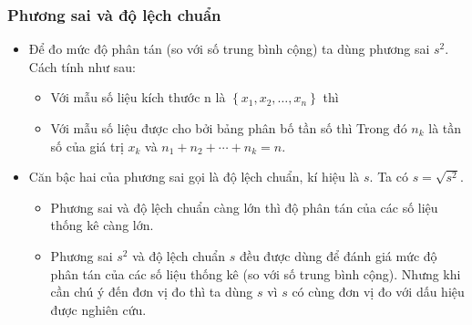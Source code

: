 \subsubsection{Phương sai và độ lệch chuẩn}
\begin{itemize}
	\item [\iconMT]  Để đo mức độ phân tán (so với số trung bình cộng) ta dùng phương sai $s^{2}$. Cách tính như sau:
	\begin{itemize}
		\item
		Với mẫu số liệu kích thước $\mathrm{n}$ là $\left\{x_{1}, x_{2}, \ldots, x_{n}\right\}$ thì
		\item
		Với mẫu số liệu được cho bởi bảng phân bố tần số thì
		Trong đó $n_k$ là tần số của giá trị $x_k$ và $n_1+n_2+ \cdots + n_k=n$.
	\end{itemize}
	\item [\iconMT]  Căn bậc hai của phương sai gọi là độ lệch chuẩn, kí hiệu là $s$. Ta có $s=\sqrt{s^2}$.
	\begin{tcolorbox}[colframe=orange,colback=white,boxrule=0.2mm]
		\begin{itemize}
			\item  Phương sai và độ lệch chuẩn càng lớn thì độ phân tán của các số liệu thống kê càng lớn.
			\item  Phương sai $s^2$ và độ lệch chuẩn $s$ đều được dùng để đánh giá mức độ phân tán của các số liệu thống kê (so với số trung bình cộng). Nhưng khi cần chú ý đến đơn vị đo thì ta dùng $s$ vì $s$ có cùng đơn vị đo với dấu hiệu được nghiên cứu.
		\end{itemize}
	\end{tcolorbox}
\end{itemize}
